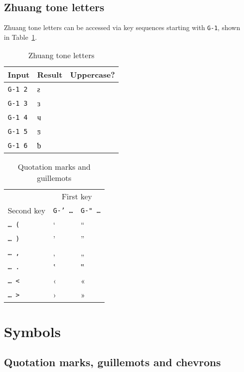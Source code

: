 \documentclass[oneside]{memoir}
\newcommand{\cmark}{\ding{51}}
\newcommand{\key}{\verb}
\newcommand{\keynv}{\texttt}
\begin{document}
{{{\subsection{Zhuang tone letters}
\label{sec:zhuang_tones}

Zhuang tone letters can be accessed via key sequences starting with \key|G-1|, shown in Table~\ref{tab:zhuang_tones}.

\begin{table}[b]
\centering
\caption{Zhuang tone letters}
\label{tab:zhuang_tones}
\centering
\begin{tabular}{lll}
\toprule
Input & Result & Uppercase? \\
\midrule
\key|G-1 2| & ƨ & \cmark \\
\key|G-1 3| & ɜ & \cmark \\
\key|G-1 4| & ч & \cmark \\
\key|G-1 5| & ƽ & \cmark \\
\key|G-1 6| & ƅ & \cmark \\
\bottomrule
\end{tabular}
\end{table}

\begin{table}[t]
\caption{Quotation marks and guillemots}
\label{tab:quotes_guillemots}
\centering
\begin{tabular}{lll}
\toprule
& \multicolumn{2}{c}{First key} \\
\cmidrule(l){2-3}
Second key & \keynv{G-' …} & \keynv{G-" …} \\
\midrule
\keynv{… (} & ‘ & “ \\
\keynv{… )} & ’ & ” \\
\keynv{… ,} & ‚ & „ \\
\keynv{… .} & ‛ & ‟ \\
\keynv{… <} & ‹ & « \\
\keynv{… >} & › & » \\
\bottomrule
\end{tabular}
\end{table}

\section{Symbols}
\label{sec:symbols}

\subsection{Quotation marks, guillemots and chevrons}
\label{sec:quotation_marks_guillemots_chevrons}

}}}
\end{document}
